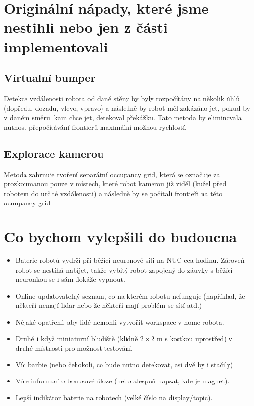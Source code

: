 \documentclass[twocolumn]{journal}
\begin{document}
\section{Originální nápady, které jsme nestihli nebo jen z části implementovali}
    \subsection{Virtualní bumper}
        Detekce vzdálenosti robota od dané stěny by byly rozpočítány na několik úhlů (dopředu, dozadu, vlevo, vpravo) a následně by robot měl zakázáno jet, pokud by v daném směru, kam chce jet, detekoval překážku. Tato metoda by eliminovala nutnost přepočítávání frontierů maximální možnou rychlostí.
    \subsection{Explorace kamerou}
        Metoda zahrnuje tvoření separátní occupancy grid, která se označuje za prozkoumanou pouze v místech, které robot kamerou již viděl (kužel před robotem do určité vzdálenosti) a následně by se počítali frontieři na této ocuupancy grid.

\section{Co bychom vylepšili do budoucna}
    \begin{itemize}
        \item Baterie robotů vydrží při běžící neuronové síti na NUC cca hodinu. Zároveň robot se nestíhá nabíjet, takže vybitý robot zapojený do záuvky s běžící neuronkou se i sám dokáže vypnout.
        \item Online updatovatelný seznam, co na kterém robotu nefunguje (například, že někteří nemají lidar nebo že někteří mají problém se sítí atd.)
        \item Nějaké opatření, aby lidé nemohli vytvořit workspace v home robota. 
        \item Druhé i když miniaturní bludiště (klidně $2\times 2$ m s kostkou uprostřed) v druhé místnosti pro možnost testování.
        \item Víc barbie (nebo čehokoli, co bude nutno detekovat, asi dvě by i stačily)
        \item Více informací o bonusové úloze (nebo alespoň napsat, kde je magnet).
        \item Lepší indikátor baterie na robotech (velké číslo na display/topic).
        
    \end{itemize}
    
\end{document}
